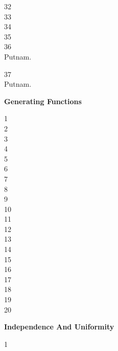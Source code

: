 32 \\


33 \\


34 \\


35 \\


36 \\
Putnam.

37 \\
Putnam.

\newpage

\textbf{Generating Functions}

1 \\


2 \\


3 \\


4 \\


5 \\


6 \\


7 \\


8 \\


9 \\


10 \\


11 \\


12 \\


13 \\


14 \\


15 \\


16 \\


17 \\


18 \\


19 \\


20 \\


\newpage

\textbf{Independence And Uniformity}

1 \\


